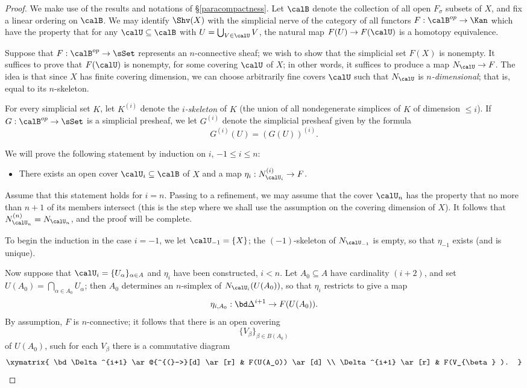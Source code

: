 \begin{proof}
We make use of the results and notations of \S \ref{paracompactness}.
Let $\calB$ denote the collection of all open $F_{\sigma}$ subsets of $X$, and fix a linear ordering on $\calB$. We may identify $\Shv(X)$ with the simplicial nerve of the category
of all functors $F: \calB^{op} \rightarrow \Kan$ which have the property that for any
$\calU \subseteq \calB$ with $U = \bigcup_{V \in \calU} V$, the natural map
$F(U) \rightarrow F(\calU)$ is a homotopy equivalence.

Suppose that $F: \calB^{op} \rightarrow \sSet$ represents an $n$-connective
sheaf; we wish to show that the simplicial set $F(X)$ is nonempty. It suffices to prove that
$F(\calU)$ is nonempty, for some covering $\calU$ of $X$; in other words, it suffices to produce a map $N_{\calU} \rightarrow F$. The idea is that since $X$ has finite covering dimension, we can choose arbitrarily fine covers $\calU$ such that $N_{\calU}$ is {\it $n$-dimensional}; that is, equal to its $n$-skeleton. 

For every simplicial set $K$, let $K^{(i)}$ denote the {\it $i$-skeleton} of $K$ (the union of all
nondegenerate simplices of $K$ of dimension $\leq i$). If $G: \calB^{op} \rightarrow \sSet$ is a simplicial presheaf, we let $G^{(i)}$ denote the simplicial presheaf given by the formula
$$ G^{(i)}(U) = (G(U))^{(i)}.$$

We will prove the following statement by induction on $i$, $-1
\leq i \leq n$:

\begin{itemize}
\item There exists an open cover $\calU_{i} \subseteq \calB$ of $X$
and a map $\eta_i: N_{\calU_i}^{(i)} \rightarrow
F$.
\end{itemize}

Assume that this statement holds for $i = n$. Passing to a
refinement, we may assume that the cover $\calU_{n}$ has the
property that no more than $n+1$ of its members intersect (this is
the step where we shall use the assumption on the covering
dimension of $X$). It follows that $N_{\calU_{n}}^{(n)} = N_{\calU_{n}}$, and the proof
will be complete.

To begin the induction in the case $i = -1$, we let $\calU_{-1} = \{ X \}$; the $(-1)$-skeleton of 
$N_{\calU_{-1}}$ is empty, so that $\eta_{-1}$ exists (and is unique).

Now suppose that $\calU_{i} = \{ U_{\alpha} \}_{ \alpha \in A} $ and $\eta_i$ have been constructed, $i < n$. Let $A_0 \subseteq A$ have cardinality $(i+2)$, and set $U(A_0) = \bigcap_{\alpha \in A_0} U_{\alpha}$; then $A_0$ determines an $n$-simplex of $N_{\calU_{i}}(U(A_0))$, so that
$\eta_i$ restricts to give a map
$$\eta_{i, A_0}: \bd \Delta^{i+1} \rightarrow F(U(A_0)).$$
By assumption, $F$ is $n$-connective; it follows that there is an open covering
$$ \{ V_{\beta} \}_{ \beta \in B(A_0) }$$
of $U(A_0)$, such for each $V_{\beta}$ there is a commutative diagram
$$ \xymatrix{ \bd \Delta^{i+1} \ar@{^{(}->}[d] \ar[r] & F(U(A_0)) \ar[d] \\
\Delta^{i+1} \ar[r] & F(V_{\beta} ). } $$


\end{proof}
